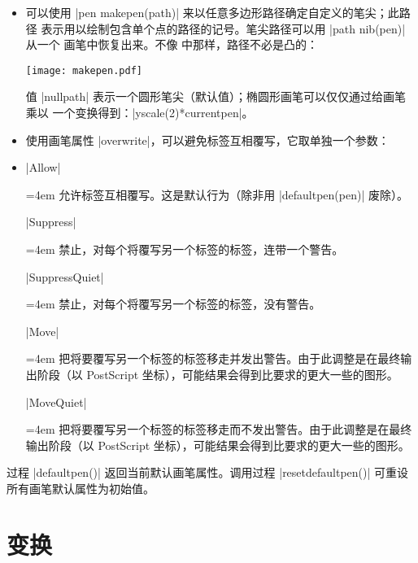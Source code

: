 \documentclass{ctexbook}
\newenvironment{funclist}{\trivlist
  \parindent=0pt
\item[]
  \def\item{\medskip\par\leftskip=0pt}
  \def\go{\par\leftskip=4em}}
{\endtrivlist}
\newcommand*\prgname[1]{\textsf{#1}}
\begin{document}
\begin{itemize}
\item 可以使用 |pen makepen(path)| 来以任意多边形路径确定自定义的笔尖；此路径
  表示用以绘制包含单个点的路径的记号。笔尖路径可以用 |path nib(pen)| 从一个
  画笔中恢复出来。不像 \MP{} 中那样，路径不必是凸的：

\begin{center}
  \texttt{[image: makepen.pdf]}
\end{center}

  值 |nullpath| 表示一个圆形笔尖（默认值）；椭圆形画笔可以仅仅通过给画笔乘以
  一个变换得到：|yscale(2)*currentpen|。

\item 使用画笔属性 |overwrite|，可以避免标签互相覆写，它取单独一个参数：
\begin{funclist}
\item |Allow| \go
  允许标签互相覆写。这是默认行为（除非用 |defaultpen(pen)| 废除）。

\item |Suppress| \go
  禁止，对每个将覆写另一个标签的标签，连带一个警告。

\item |SuppressQuiet| \go
  禁止，对每个将覆写另一个标签的标签，没有警告。

\item |Move| \go
  把将要覆写另一个标签的标签移走并发出警告。由于此调整是在最终输出阶段（以
  \prgname{PostScript} 坐标），可能结果会得到比要求的更大一些的图形。

\item |MoveQuiet| \go
  把将要覆写另一个标签的标签移走而不发出警告。由于此调整是在最终输出阶段（以
  \prgname{PostScript} 坐标），可能结果会得到比要求的更大一些的图形。
\end{funclist}
\end{itemize}

过程 |defaultpen()| 返回当前默认画笔属性。调用过程 |resetdefaultpen()| 可重设
所有画笔默认属性为初始值。



\section{变换}
\label{sec:transforms}
\end{document}

